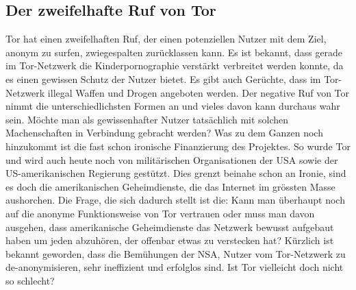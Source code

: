 \subsection{Der zweifelhafte Ruf von Tor}
Tor hat einen zweifelhaften Ruf, der einen potenziellen Nutzer mit dem Ziel, anonym zu surfen, zwiegespalten zurücklassen kann. Es ist bekannt, dass gerade im Tor-Netzwerk die Kinderpornographie verstärkt verbreitet werden konnte, da es einen gewissen Schutz der Nutzer bietet. Es gibt auch Gerüchte, dass im Tor-Netzwerk illegal Waffen und Drogen angeboten werden. Der negative Ruf von Tor nimmt die unterschiedlichsten Formen an und vieles davon kann durchaus wahr sein. Möchte man als gewissenhafter Nutzer tatsächlich mit solchen Machenschaften in Verbindung gebracht werden? Was zu dem Ganzen noch hinzukommt ist die fast schon ironische Finanzierung des Projektes. So wurde Tor und wird auch heute noch von militärischen Organisationen der USA sowie der US-amerikanischen Regierung  gestützt. Dies grenzt beinahe schon an Ironie, sind es doch die amerikanischen Geheimdienste, die das Internet im grössten Masse aushorchen. Die Frage, die sich dadurch stellt ist die: Kann man überhaupt noch auf die anonyme Funktionsweise von Tor vertrauen oder muss man davon ausgehen, dass amerikanische Geheimdienste das Netzwerk bewusst aufgebaut haben um jeden abzuhören, der offenbar etwas zu verstecken hat? Kürzlich ist bekannt geworden, dass die Bemühungen der NSA, Nutzer vom Tor-Netzwerk zu de-anonymisieren, sehr ineffizient und erfolglos sind. Ist Tor vielleicht doch nicht so schlecht?

